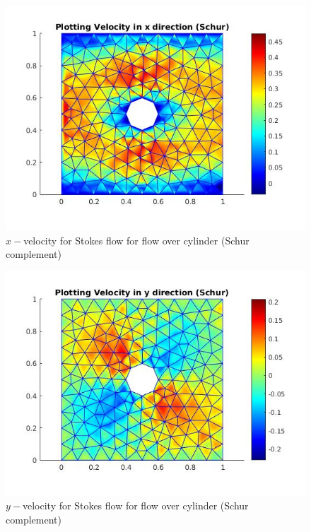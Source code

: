 \documentclass[a4paper,12pt]{book}
\begin{document}
\begin{figure}
  \includegraphics[width=\linewidth]{velocity_X_schur.jpg}
  \caption{$x-$velocity for Stokes flow for flow over cylinder (Schur complement)}
  \label{fig:velocity_x_cylinder_stokes_schur}
\end{figure}

\begin{figure}
  \includegraphics[width=\linewidth]{velocity_Y_schur.jpg}
  \caption{$y-$velocity for Stokes flow for flow over cylinder (Schur complement)}
  \label{fig:velocity_y_cylinder_stokes_schur}
\end{figure}
\end{document}
